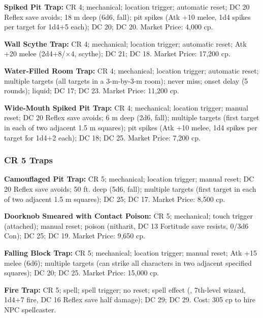 \textbf{Spiked Pit Trap:} CR 4; mechanical; location trigger; automatic reset; DC 20 Reflex save avoids; 18 m deep (6d6, fall); pit spikes (Atk +10 melee, 1d4 spikes per target for 1d4+5 each);  DC 20;  DC 20. Market Price: 4,000 cp.

\textbf{Wall Scythe Trap:} CR 4; mechanical; location trigger; automatic reset; Atk +20 melee (2d4+8/$\times$4, scythe);  DC 21;  DC 18. Market Price: 17,200 cp.

\textbf{Water-Filled Room Trap:} CR 4; mechanical; location trigger; automatic reset; multiple targets (all targets in a 3-m-by-3-m room); never miss; onset delay (5 rounds); liquid;  DC 17;  DC 23. Market Price: 11,200 cp.

\textbf{Wide-Mouth Spiked Pit Trap:} CR 4; mechanical; location trigger; manual reset; DC 20 Reflex save avoids; 6 m deep (2d6, fall); multiple targets (first target in each of two adjacent 1.5 m squares); pit spikes (Atk +10 melee, 1d4 spikes per target for 1d4+2 each);  DC 18;  DC 25. Market Price: 7,200 cp.

\subsubsection{CR 5 Traps}
\textbf{Camouflaged Pit Trap:} CR 5; mechanical; location trigger; manual reset; DC 20 Reflex save avoids; 50 ft. deep (5d6, fall); multiple targets (first target in each of two adjacent 1.5 m squares);  DC 25;  DC 17. Market Price: 8,500 cp.

\textbf{Doorknob Smeared with Contact Poison:} CR 5; mechanical; touch trigger (attached); manual reset; poison (nitharit, DC 13 Fortitude save resists, 0/3d6 Con);  DC 25;  DC 19. Market Price: 9,650 cp.

\textbf{Falling Block Trap:} CR 5; mechanical; location trigger; manual reset; Atk +15 melee (6d6); multiple targets (can strike all characters in two adjacent specified squares);  DC 20;  DC 25. Market Price: 15,000 cp.

\textbf{Fire Trap:} CR 5; spell; spell trigger; no reset; spell effect (, 7th-level wizard, 1d4+7 fire, DC 16 Reflex save half damage);  DC 29;  DC 29. Cost: 305 cp to hire NPC spellcaster.

